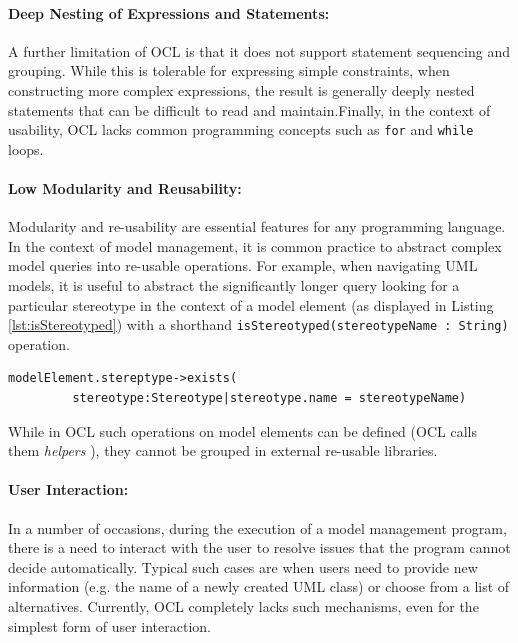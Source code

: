\paragraph{Deep Nesting of Expressions and Statements:} A further limitation of OCL is that it does not support statement sequencing and grouping. While this is tolerable for expressing simple constraints, when constructing more complex expressions, the result is generally deeply nested statements that can be difficult to read and maintain.Finally, in the context of usability, OCL lacks common programming concepts such as \verb|for| and \verb|while| loops.

\paragraph{Low Modularity and Reusability:} Modularity and re-usability are essential features for any programming language. In the context of model management, it is common practice to abstract complex model queries into re-usable operations. For example, when navigating UML models, it is useful to abstract the significantly longer query looking for a particular stereotype in the context of a model element (as displayed in Listing \ref{lst:isStereotyped}) with a shorthand \verb|isStereotyped(stereotypeName : String)| operation. 

\begin{lstlisting}[float=tbp, basicstyle=\ttfamily\footnotesize, flexiblecolumns=true, flexiblecolumns=true, nolol=false, caption=Example OCL Query, label=lst:isStereotyped, language=OCL]
modelElement.stereptype->exists(
         stereotype:Stereotype|stereotype.name = stereotypeName)
\end{lstlisting}

While in OCL such operations on model elements can be defined (OCL calls them \textit{helpers} \cite{OCL}), they cannot be grouped in external re-usable libraries.

\paragraph{User Interaction:} In a number of occasions, during the execution of a model management program, there is a need to interact with the user to resolve issues that the program cannot decide automatically. Typical such cases are when users need to provide new information (e.g. the name of a newly created UML class) or choose from a list of alternatives. Currently, OCL completely lacks such mechanisms, even for the simplest form of  user interaction.\\

